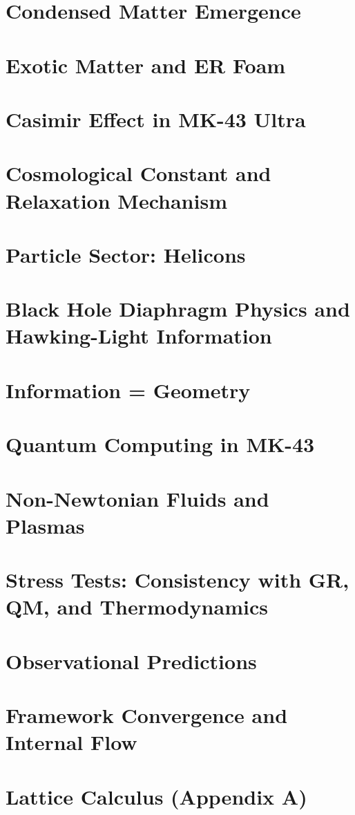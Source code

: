 \documentclass[11pt,oneside]{book}
\theoremstyle{definition}
\begin{document}
\chapter{Condensed Matter Emergence}
\chapter{Exotic Matter and ER Foam}
\chapter{Casimir Effect in MK-43 Ultra}
\chapter{Cosmological Constant and Relaxation Mechanism}
\chapter{Particle Sector: Helicons}
\chapter{Black Hole Diaphragm Physics and Hawking-Light Information}
\chapter{Information = Geometry}
\chapter{Quantum Computing in MK-43}
\chapter{Non-Newtonian Fluids and Plasmas}
\chapter{Stress Tests: Consistency with GR, QM, and Thermodynamics}
\chapter{Observational Predictions}
\chapter{Framework Convergence and Internal Flow}

\appendix

\chapter{Lattice Calculus (Appendix A)}
\end{document}
